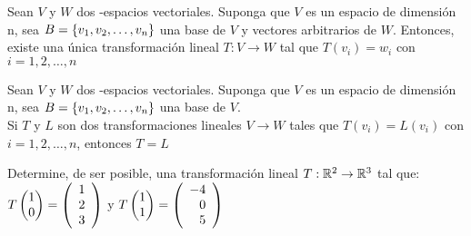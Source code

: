 \begin{theorem}
Sean $V$ y $W$ dos \dobleK-espacios vectoriales. Suponga que $V$ es un espacio de dimensión n, sea $B =  \lbrace v_1, v_2, \ldots, v_n \rbrace$ una base de $V$ y  vectores arbitrarios de $W$. Entonces, existe una única transformación lineal $T: V \to W$ tal que $T(v_i) = w_i$ con  $i = 1,2, \hdots, n$
\end{theorem}

\begin{theorem}[Corolario]
Sean $V$ y $W$ dos \dobleK-espacios vectoriales. Suponga que $V$ es un espacio de dimensión n, sea $B =  \lbrace v_1, v_2, \ldots, v_n \rbrace$ una base de $V$.\\
Si $T$ y $L$ son dos transformaciones lineales $V \to W$ tales que $T(v_i) = L(v_i)$ con  $i = 1,2, \hdots, n$, entonces $T = L$
\end{theorem}
\newpage
\begin{ejemplo}
Determine, de ser posible, una transformación lineal $T: \mathbb{R}^2 \to \mathbb{R}^3$ tal que: $T\begin{pmatrix} 1\\ 0\\ \end{pmatrix}  = \left( \begin{array}{r} 1\\ 2\\ 3 \end{array} \right) $ y $T\begin{pmatrix} 1\\ 1\\ \end{pmatrix}  = \left( \begin{array}{r} -4\\ 0\\ 5 \end{array} \right) $
\end{ejemplo}

